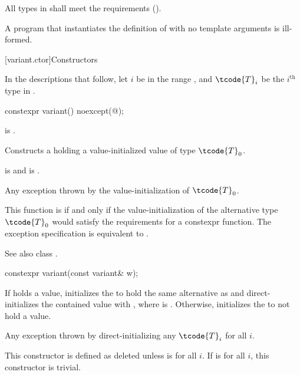 \pnum
All types in  shall meet
the  requirements ().

\pnum
A program that instantiates the definition of  with
no template arguments is ill-formed.

[variant.ctor]{Constructors}

\pnum
In the descriptions that follow, let $i$ be in the range ,
and $\tcode{T}_i$ be the $i^\text{th}$ type in .

%
\begin{itemdecl}
constexpr variant() noexcept(@\seebelow@);
\end{itemdecl}

\begin{itemdescr}
\pnum
\constraints
{} is .

\pnum
\effects
Constructs a  holding a value-initialized value of type $\tcode{T}_0$.

\pnum
\ensures
{} is  and  is .

\pnum
\throws
Any exception thrown by the value-initialization of $\tcode{T}_0$.

\pnum
\remarks
This function is  if and only if the
value-initialization of the alternative type $\tcode{T}_0$ would satisfy the
requirements for a constexpr function.
The exception specification is equivalent to
.
\begin{note}
See also class .
\end{note}
\end{itemdescr}

%
\begin{itemdecl}
constexpr variant(const variant& w);
\end{itemdecl}

\begin{itemdescr}
\pnum
\effects
If  holds a value, initializes the  to hold the same
alternative as  and direct-initializes the contained value
with , where  is .
Otherwise, initializes the  to not hold a value.

\pnum
\throws
Any exception thrown by direct-initializing any $\tcode{T}_i$ for all $i$.

\pnum
\remarks
This constructor is defined as deleted unless
 is  for all $i$.
If 
is  for all $i$, this constructor is trivial.
\end{itemdescr}

